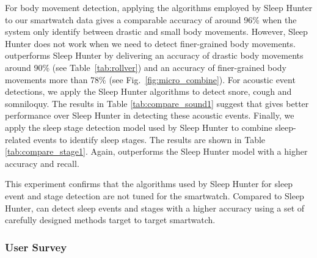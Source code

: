For body movement detection, applying the algorithms employed by Sleep Hunter to our smartwatch data gives a comparable accuracy of around
96\% when the system only identify between drastic and small body movements. However, Sleep Hunter does not work when we need to detect
finer-grained body movements.  {\systemname} outperforms Sleep Hunter by delivering an accuracy of drastic body movements around 90\% (see
Table~\ref{tab:rollver}) and an accuracy of finer-grained body movements more than 78\% (see Fig.~\ref{fig:micro_combine}). For acoustic
event detections, we apply the Sleep Hunter algorithms to detect snore, cough and somniloquy. The results in Table \ref{tab:compare_sound1}
suggest that {\systemname} gives better performance over Sleep Hunter in detecting these acoustic events. Finally, we apply the sleep stage
detection model used by Sleep Hunter to combine sleep-related events to identify sleep stages. The results are shown in Table
\ref{tab:compare_stage1}. Again,  {\systemname} outperforms the Sleep Hunter model with a higher accuracy and recall.


This experiment confirms that the algorithms used by Sleep Hunter for sleep event and stage detection are not tuned for the smartwatch. Compared to Sleep Hunter, {\systemname} can detect sleep events and stages with a higher accuracy using a set of carefully designed methods target to target smartwatch.


\subsubsection{User Survey}\label{sec:user_survey}

